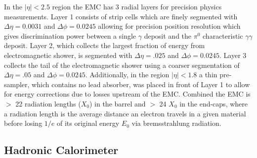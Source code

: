 In the $|\eta| < 2.5$ region the EMC has 3 radial layers for precision physics
measurements.  Layer 1 consists of strip cells which are finely segmented with
$\Delta\eta = 0.0031$ and $\Delta\phi = 0.0245$ allowing for precision position
resolution which gives discrimination power between a single $\gamma$ deposit
and the $\pi^0$ characteristic $\gamma\gamma$ deposit. Layer 2, which collects
the largest fraction of energy from electromagnetic shower, is segmented with
$\Delta\eta = .025$ and $\Delta\phi = 0.0245$. Layer 3 collects the tail of the
electromagnetic shower using a coarser segmentation of $\Delta\eta = .05$ and
$\Delta\phi = 0.0245$.  Additionally, in the region $|\eta| < 1.8$ a thin
pre-sampler, which contains no lead absorber, was placed in front of Layer 1 to
allow for energy corrections due to losses upstream of the EMC.  Combined the
EMC is $>$ 22 radiation lengths ($X_0$) in the barrel and $>$ 24 $X_0$ in the
end-caps, where a radiation length is the average distance an electron travels
in a given material before losing $1/e$ of its original energy $E_0$ via
bremsstrahlung radiation.

\subsection{Hadronic Calorimeter}

